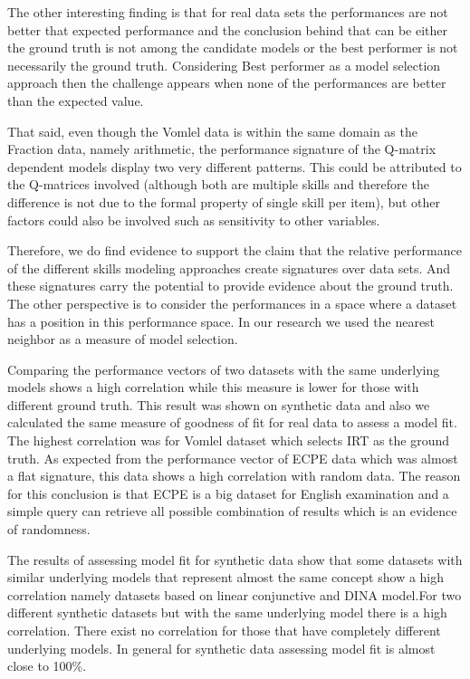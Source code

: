 The other interesting finding is that for real data sets the performances are not better that expected performance and the conclusion behind that can be either the ground truth is not among the candidate models or the best performer is not necessarily the ground truth. Considering Best performer as a model selection approach then the challenge appears when none of the performances are better than the expected value.

That said, even though the Vomlel data is within the same domain as the Fraction data, namely arithmetic, the performance signature of the Q-matrix dependent models display two very different patterns.  This could be attributed to the Q-matrices involved (although both are multiple skills and therefore the difference is not due to the formal property of single skill per item), but other factors could also be involved such as sensitivity to other variables.

Therefore, we do find evidence to support the claim that the relative performance of the different skills modeling approaches create signatures over data sets.  And these signatures carry the potential to provide evidence about the ground truth. The other perspective is to consider the performances in a space where a dataset has a position in this performance space. In our research we used the nearest neighbor as a measure of model selection.

Comparing the performance vectors of two datasets with the same underlying models shows a high correlation while this measure is lower for those with different ground truth. This result was shown on synthetic data and also we calculated the same measure of goodness of fit for real data to assess a model fit. The highest correlation was for Vomlel dataset which selects IRT as the ground truth. As expected from the performance vector of ECPE data which was almost a flat signature, this data shows a high correlation with random data. The reason for this conclusion is that ECPE is a big dataset for English examination and a simple query can retrieve all possible combination of results which is an evidence of randomness.

The results of assessing model fit for synthetic data show that some datasets with similar underlying models that represent almost the same concept show a high correlation namely datasets based on linear conjunctive and DINA model.For two different synthetic datasets but with the same underlying model there is a high correlation. There exist no correlation for those that have completely different underlying models. In general for synthetic data assessing model fit is almost close to 100\%. 

